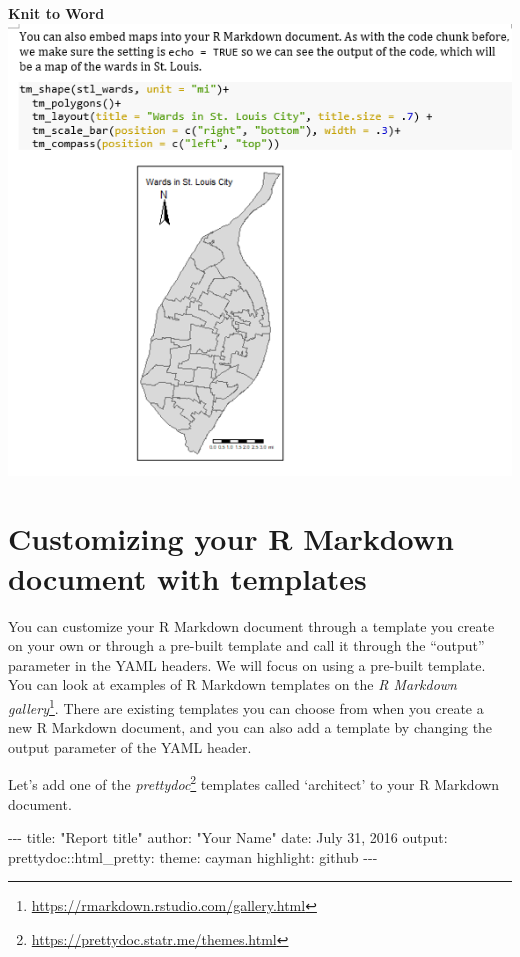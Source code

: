 \documentclass[
  krantz2]{krantz}
\makeatletter
\newenvironment{Shaded}{\begin{snugshade}}{\end{snugshade}}
\newcommand{\DecValTok}[1]{\textcolor[rgb]{0.06,0.06,0.06}{#1}}
\newcommand{\NormalTok}[1]{#1}
\newcommand{\SpecialCharTok}[1]{\textcolor[rgb]{0,0,0}{#1}}
\newcommand{\StringTok}[1]{\textcolor[rgb]{0.5,0.5,0.5}{#1}}
\newenvironment{kframe}{%
\medskip{}
\setlength{\fboxsep}{.8em}
 \def\at@end@of@kframe{}%
 \ifinner\ifhmode%
  \def\at@end@of@kframe{\end{minipage}}%
  \begin{minipage}{\columnwidth}%
 \fi\fi%
 \def\FrameCommand##1{\hskip\@totalleftmargin \hskip-\fboxsep
 \colorbox{shadecolor}{##1}\hskip-\fboxsep
     \hskip-\linewidth \hskip-\@totalleftmargin \hskip\columnwidth}%
 \MakeFramed {\advance\hsize-\width
   \@totalleftmargin\z@ \linewidth\hsize
   \@setminipage}}%
 {\par\unskip\endMakeFramed%
 \at@end@of@kframe}
\renewenvironment{Shaded}{\begin{kframe}}{\end{kframe}}
\makeatother
\begin{document}
\textbf{Knit to Word}
\includegraphics{images/word_output.png}

\hypertarget{customizing-your-r-markdown-document-with-templates}{%
\section{Customizing your R Markdown document with templates}\label{customizing-your-r-markdown-document-with-templates}}

You can customize your R Markdown document through a template you create on your own or through a pre-built template and call it through the ``output'' parameter in the YAML headers. We will focus on using a pre-built template. You can look at examples of R Markdown templates on the \emph{R Markdown gallery}\footnote{\url{https://rmarkdown.rstudio.com/gallery.html}}. There are existing templates you can choose from when you create a new R Markdown document, and you can also add a template by changing the output parameter of the YAML header.

Let's add one of the \emph{prettydoc}\footnote{\url{https://prettydoc.statr.me/themes.html}} templates called `architect' to your R Markdown document.

\begin{Shaded}
\begin{Highlighting}[]
\SpecialCharTok{{-}{-}{-}}
\NormalTok{title}\SpecialCharTok{:} \StringTok{"Report title"}
\NormalTok{author}\SpecialCharTok{:} \StringTok{"Your Name"}
\NormalTok{date}\SpecialCharTok{:}\NormalTok{ July }\DecValTok{31}\NormalTok{, }\DecValTok{2016}
\NormalTok{output}\SpecialCharTok{:}
\NormalTok{ prettydoc}\SpecialCharTok{::}\NormalTok{html\_pretty}\SpecialCharTok{:}
\NormalTok{    theme}\SpecialCharTok{:}\NormalTok{ cayman}
\NormalTok{    highlight}\SpecialCharTok{:}\NormalTok{ github}
\SpecialCharTok{{-}{-}{-}}
\end{Highlighting}
\end{Shaded}
\end{document}
